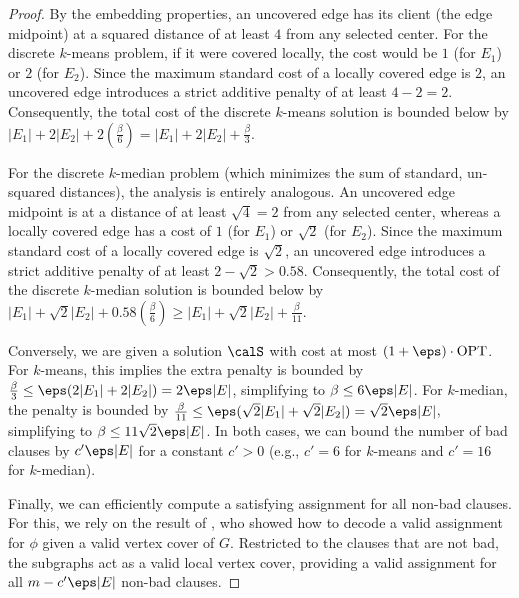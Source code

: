 \begin{proof}
By the embedding properties, an uncovered edge has its client (the edge midpoint) at a squared distance of at least $4$ from any selected center. For the discrete $k$-means problem, if it were covered locally, the cost would be $1$ (for $E_1$) or $2$ (for $E_2$). Since the maximum standard cost of a locally covered edge is $2$, an uncovered edge introduces a strict additive penalty of at least $4 - 2 = 2$. Consequently, the total cost of the discrete $k$-means solution is bounded below by $|E_1| + 2|E_2| + 2\left(\frac{\beta}{6}\right) = |E_1| + 2|E_2| + \frac{\beta}{3}$.

For the discrete $k$-median problem (which minimizes the sum of standard, un-squared distances), the analysis is entirely analogous. An uncovered edge midpoint is at a distance of at least $\sqrt{4} = 2$ from any selected center, whereas a locally covered edge has a cost of $1$ (for $E_1$) or $\sqrt{2}$ (for $E_2$). Since the maximum standard cost of a locally covered edge is $\sqrt{2}$, an uncovered edge introduces a strict additive penalty of at least $2 - \sqrt{2} > 0.58$. Consequently, the total cost of the discrete $k$-median solution is bounded below by $|E_1| + \sqrt{2}|E_2| + 0.58\left(\frac{\beta}{6}\right) \ge |E_1| + \sqrt{2}|E_2| + \frac{\beta}{11}$.

Conversely, we are given a solution $\calS$ with cost at most $(1+\eps) \cdot \text{OPT}$. 
For $k$-means, this implies the extra penalty is bounded by $\frac{\beta}{3} \leq \eps(2|E_1| + 2|E_2|) = 2\eps |E|$, simplifying to $\beta \leq 6\eps |E|$. 
For $k$-median, the penalty is bounded by $\frac{\beta}{11} \leq \eps(\sqrt{2}|E_1| + \sqrt{2}|E_2|) = \sqrt{2}\eps |E|$, simplifying to $\beta \leq 11\sqrt{2}\eps |E|$. 
In both cases, we can bound the number of bad clauses by $c'\eps|E|$ for a constant $c' > 0$ (e.g., $c'=6$ for $k$-means and $c'=16$ for $k$-median).

Finally, we can efficiently compute a satisfying assignment for all non-bad clauses. For this, we rely on the result of \cite{BergBKMZ20}, who showed how to decode a valid assignment for $\phi$ given a valid vertex cover of $G$. Restricted to the clauses that are not bad, the subgraphs act as a valid local vertex cover, providing a valid assignment for all $m - c'\eps |E|$ non-bad clauses.
\end{proof}

